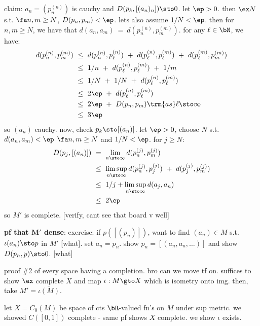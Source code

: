 claim: $a_{n}=(p_{n}^{(n)})$ is cauchy and $D(p_{k},[(a_{n})_{n}])\sto0$.
let $\ep>0$. then $\ex N$ s.t. $\fa n,m\geq N$, $D(p_{n},p_{m})<\ep$.
lets also assume $1/N<\ep$. then for $n,m\geq N$, we have that
$d(a_{n},a_{m}) \ = \ d(p_{n}^{(n)},p_{m}^{(m)})$.
for any $\ell\in\bN$, we have:
\begin{align*}
	d(p_{n}^{(n)},p_{m}^{(m)}) & \ \leq \
	d(p_{n}^{(n)},p_{\ell}^{(n)}) \ + \ d(p_{\ell}^{(n)},p_{\ell}^{(m)})
	\ + \ d(p_{\ell}^{(m)},p_{m}^{(m)}) \\
	& \ \leq \ 1/n \ + \ d(p_{\ell}^{(n)},p_{\ell}^{(m)}) \ + \ 1/m \\
	& \ \leq \ 1/N \ + \ 1/N \ + \ d(p_{\ell}^{(n)},p_{\ell}^{(m)}) \\
	& \ \leq \ 2\ep \ + \ d(p_{\ell}^{(n)},p_{\ell}^{(m)}) \\
	& \ \leq \ 2\ep \ + \ D(p_{n},p_{m}) \trm{ as } \ell \sto \infty \\
	& \ \leq \ 3\ep
\end{align*}
so $(a_{n})$ cauchy. now, check $p_{k}\sto[(a_{n})]$.
let $\ep>0$, choose $N$ s.t. $d(a_{n},a_{m})<\ep$ $\fa n,m\geq N$ and $1/N<\ep$.
for $j\geq N$:
\begin{align*}
	D(p_{j},[(a_{n})]) & \ = \ \lim_{n\sto\infty}d(p_{n}^{(j)},p_{m}^{(j)}) \\
	& \ \leq \ \limsup_{n\sto\infty}
	d(p_{n}^{(j)},p_{j}^{(j)}) \ + \ d(p_{j}^{(j)},p_{m}^{(j)}) \\
	& \ \leq \ 1/j + \limsup_{n\sto\infty}d(a_{j},a_{n}) \\
	& \ \leq \ 2\ep
\end{align*}
so $M'$ is complete. [verify, cant see that board v well]

\textbf{pf that $\bm{M'}$ dense}:
exercise: if $p([(p_{n})])$, want to find $(a_{n})\in M$ s.t. $\iota(a_{n})\sto p$
in $M'$ [what].
set $a_{n}=p_{n}$. show $p_{n}=[(a_{n},a_{n},\dots)]$ and show $D(p_{n},p)\sto0$.
[what]

proof \#2 of every space having a completion. bro can we move tf on.
suffices to show $\ex$ complete $X$ and map $\iota:M\gto X$ which is isometry onto img.
then, take $M'=\bar{\iota(M)}$.

let $X=C_{0}(M)$ be space of cts $\bR$-valued fn's on $M$ under sup metric.
we showed $C([0,1])$ complete - same pf shows $X$ complete.
we show $\iota$ exists.

